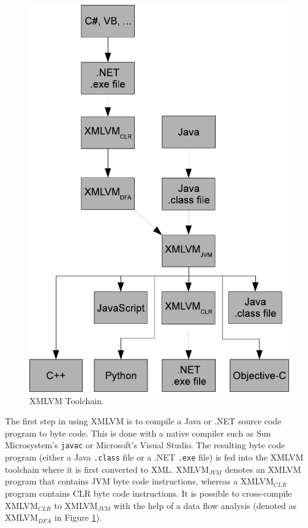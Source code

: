 \documentclass[11pt]{book}
\begin{document}
\begin{figure}
\includegraphics{pics/xmlvm_toolchain.pdf}
\caption{\label{FIG_XMLVM_TOOLCHAIN} XMLVM Toolchain.}
\end{figure}

The first step in using XMLVM is to compile a Java or .NET source code
program to byte code. This is done with a native compiler such as Sun
Microsystem's \texttt{javac} or Microsoft's Visual Studio. The resulting
byte code program (either a Java \texttt{.class} file or a .NET
\texttt{.exe} file) is fed into the XMLVM toolchain where it is first
converted to XML. XMLVM$_{JVM}$ denotes an XMLVM program that contains
JVM byte code instructions, whereas a XMLVM$_{CLR}$ program contains
CLR byte code instructions. It is possible to cross-compile
XMLVM$_{CLR}$ to XMLVM$_{JVM}$ with the help of a data flow analysis
(denoted as XMLVM$_{DFA}$ in Figure \ref{FIG_XMLVM_TOOLCHAIN}).
\end{document}
